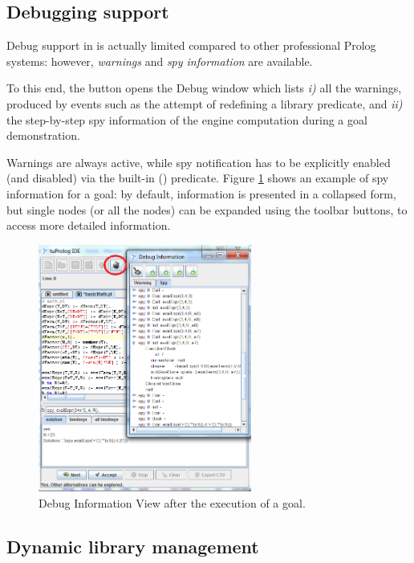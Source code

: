 \subsection{Debugging support}
\label{ssec:debugging-support}

Debug support in \tuprolog{} is actually limited compared to other professional Prolog systems: however, \textit{warnings} and \textit{spy information} are available.

To this end, the  button opens the Debug window which lists \textit{i)} all the warnings, produced by events such as the attempt of redefining a library predicate, and \textit{ii)} the step-by-step spy information of the engine computation during a goal demonstration.
 
Warnings are always active, while spy notification has to be explicitly enabled (and disabled) via the built-in  () predicate.
%
Figure \ref{fig:gui-debug} shows an example of spy information for a goal: by default, information is presented in a collapsed form, but single nodes (or all the nodes) can be expanded using the toolbar buttons, to access more detailed information.

\begin{figure}
\centering
\includegraphics[width=7cm]{images/gui-debug}
\caption{Debug Information View after the execution of a goal.}
\label{fig:gui-debug}
\end{figure}

\subsection{Dynamic library management}
\label{ssec:dynamic-library-management}

